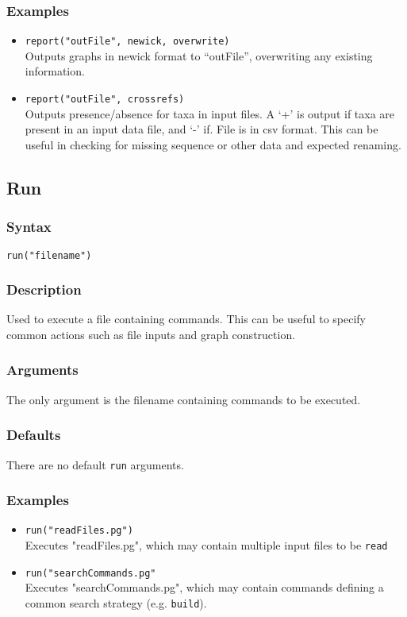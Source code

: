 \documentclass[11pt]{article}
\begin{document}
		\subsubsection{Examples}
				\begin{itemize}
					\item{\texttt{report("outFile", newick, overwrite)}\\ Outputs graphs in newick format to ``outFile'', overwriting any existing information.}
					\item{\texttt{report("outFile", crossrefs)}\\ Outputs presence/absence for taxa in input files.  A `+' is output  if taxa are present in an input data file, 
					and `-' if. File is in csv format.  This can be useful in checking for missing sequence or other data and expected renaming.}
				\end{itemize}
			
	\subsection{Run}
		\subsubsection{Syntax}
				\texttt{run("filename")}
		\subsubsection{Description}
			Used to execute a file containing commands.  This can be useful to specify common actions such
			as file inputs and graph construction. 
		\subsubsection{Arguments}
			The only argument is the filename containing commands to be executed.
		\subsubsection{Defaults}
			There are no default \texttt{run} arguments.  
		\subsubsection{Examples}
				\begin{itemize}
				\item{\texttt{run("readFiles.pg")}\\ Executes "readFiles.pg", which may contain multiple input files to be \texttt{read}}
				\item{\texttt{run("searchCommands.pg"}\\ Executes "searchCommands.pg", which may contain commands defining a common search strategy (e.g. \texttt{build}).}
			\end{itemize}
	
\end{document}
